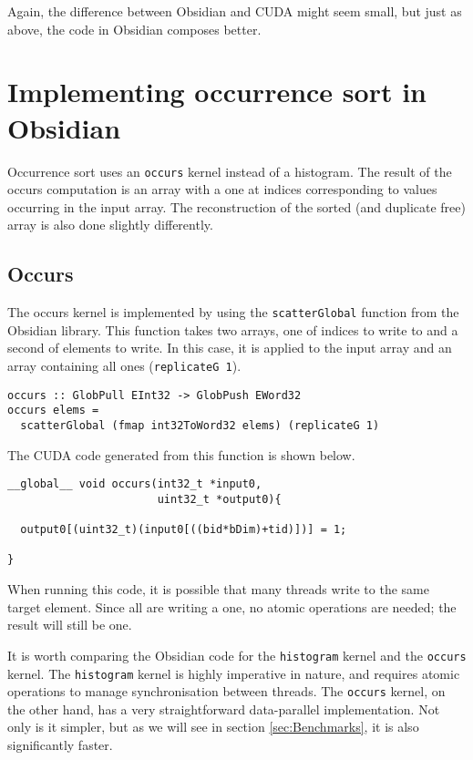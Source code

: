 Again, the difference between Obsidian and CUDA might seem small, but
just as above, the code in Obsidian composes better.

\section{Implementing occurrence sort in Obsidian} 
\label{sec:occur}

Occurrence sort uses an {\tt occurs} kernel instead of a 
histogram. The result of the occurs computation is an array with a one 
at indices corresponding to values occurring in the input array. The 
reconstruction of the sorted (and duplicate free) array is also done 
slightly differently.

\subsection{Occurs}

The occurs kernel is implemented by using the {\tt scatterGlobal} 
function from the Obsidian library. This function takes two arrays, one of 
indices to write to and a second of elements to write. In this case, it 
is applied to the input array and an array containing all ones 
({\tt replicateG 1}). 

\begin{small}
\begin{Verbatim}[samepage=true] 
occurs :: GlobPull EInt32 -> GlobPush EWord32
occurs elems = 
  scatterGlobal (fmap int32ToWord32 elems) (replicateG 1)
\end{Verbatim}
\end{small} 

The CUDA code generated from this function is shown below. 

\begin{small}
\begin{Verbatim}[samepage=true] 
__global__ void occurs(int32_t *input0,
                       uint32_t *output0){
   
  output0[(uint32_t)(input0[((bid*bDim)+tid)])] = 1;
  
}
\end{Verbatim} 
\end{small} 

When running this code, it is possible that many threads write to the same 
target element. Since all are writing a one, no atomic operations are needed; 
the result will still be one. 

It is worth comparing the Obsidian code for the {\tt histogram} kernel
and the {\tt occurs} kernel. The {\tt histogram} kernel is highly
imperative in nature, and requires atomic operations to manage
synchronisation between threads. The {\tt occurs} kernel, on the other
hand, has a very straightforward data-parallel implementation. Not only
is it simpler, but as we will see in section \ref{sec:Benchmarks}, it
is also significantly faster.

